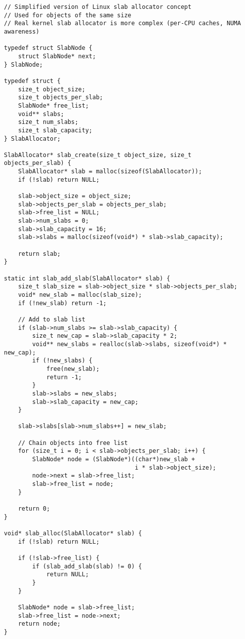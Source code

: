 \begin{lstlisting}
// Simplified version of Linux slab allocator concept
// Used for objects of the same size
// Real kernel slab allocator is more complex (per-CPU caches, NUMA awareness)

typedef struct SlabNode {
    struct SlabNode* next;
} SlabNode;

typedef struct {
    size_t object_size;
    size_t objects_per_slab;
    SlabNode* free_list;
    void** slabs;
    size_t num_slabs;
    size_t slab_capacity;
} SlabAllocator;

SlabAllocator* slab_create(size_t object_size, size_t objects_per_slab) {
    SlabAllocator* slab = malloc(sizeof(SlabAllocator));
    if (!slab) return NULL;

    slab->object_size = object_size;
    slab->objects_per_slab = objects_per_slab;
    slab->free_list = NULL;
    slab->num_slabs = 0;
    slab->slab_capacity = 16;
    slab->slabs = malloc(sizeof(void*) * slab->slab_capacity);

    return slab;
}

static int slab_add_slab(SlabAllocator* slab) {
    size_t slab_size = slab->object_size * slab->objects_per_slab;
    void* new_slab = malloc(slab_size);
    if (!new_slab) return -1;

    // Add to slab list
    if (slab->num_slabs >= slab->slab_capacity) {
        size_t new_cap = slab->slab_capacity * 2;
        void** new_slabs = realloc(slab->slabs, sizeof(void*) * new_cap);
        if (!new_slabs) {
            free(new_slab);
            return -1;
        }
        slab->slabs = new_slabs;
        slab->slab_capacity = new_cap;
    }

    slab->slabs[slab->num_slabs++] = new_slab;

    // Chain objects into free list
    for (size_t i = 0; i < slab->objects_per_slab; i++) {
        SlabNode* node = (SlabNode*)((char*)new_slab +
                                     i * slab->object_size);
        node->next = slab->free_list;
        slab->free_list = node;
    }

    return 0;
}

void* slab_alloc(SlabAllocator* slab) {
    if (!slab) return NULL;

    if (!slab->free_list) {
        if (slab_add_slab(slab) != 0) {
            return NULL;
        }
    }

    SlabNode* node = slab->free_list;
    slab->free_list = node->next;
    return node;
}


\end{lstlisting}

